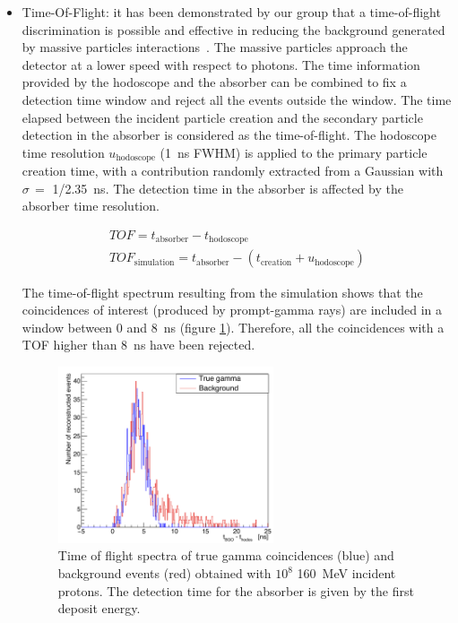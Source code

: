 \begin{itemize}
\item Time-Of-Flight: it has been demonstrated by our group that a time-of-flight discrimination is possible and effective in reducing the background generated by massive particles interactions~\cite{Testa:2010aa}. The massive particles approach the detector at a lower speed with respect to photons. The time information provided by the hodoscope and the absorber can be combined to fix a detection time window and reject all the events outside the window. The time elapsed between the incident particle creation and the secondary particle detection in the absorber is considered as the time-of-flight. The hodoscope time resolution $u_{\mathrm{hodoscope}}$ (1~ns FWHM) is applied to the primary particle creation time, with a contribution randomly extracted from a Gaussian with $\sigma\,=$ 1/2.35~ns. The detection time in the absorber is affected by the absorber time resolution.

 \begin{eqnarray}
TOF = t_{\mathrm{absorber}}-t_{\mathrm{hodoscope}} \\
TOF_{\mathrm{simulation}} = t_{\mathrm{absorber}}-(t_{\mathrm{creation}} + u_{\mathrm{hodoscope}})
\label{TOF_equation}
\end{eqnarray} 

The time-of-flight spectrum resulting from the simulation shows that the coincidences of interest (produced by prompt-gamma rays) are included in a window between 0 and 8~ns (figure \ref{fig:fig_TOF_distribution_CC_simulation_Hadronth}). Therefore, all the coincidences with a TOF higher than 8~ns have been rejected.
\begin{figure}	
  \centering
  \includegraphics[width=0.6\textwidth]{./Figure/TOFspectra_2}
  \caption{Time of flight spectra of true gamma coincidences (blue) and background events (red) obtained with $10^{8}$ 160~MeV incident protons. The detection time for the absorber is given by the first deposit energy.}	
  \label{fig:fig_TOF_distribution_CC_simulation_Hadronth}
\end{figure}


\end{itemize}
